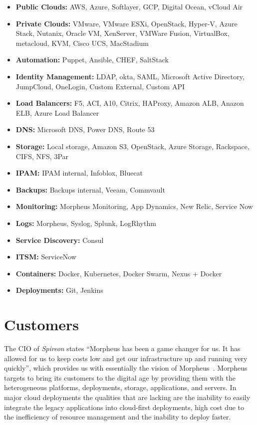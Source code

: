 \begin{itemize}
	\item \textbf{Public Clouds:} AWS, Azure, Softlayer, GCP, Digital 
	Ocean, vCloud Air
	\item \textbf{Private Clouds:} VMware, VMware ESXi, OpenStack, Hyper-V, 
	Azure Stack, Nutanix, Oracle VM, XenServer, VMWare Fusion, VirtualBox, 
	metacloud, KVM, Cisco UCS, MacStadium
	\item \textbf{Automation:} Puppet, Ansible, CHEF, SaltStack
	\item \textbf{Identity Management:} LDAP, okta, SAML, Microsoft Active 
	Directory, JumpCloud, OneLogin, Custom External, Custom API
	\item \textbf{Load Balancers:} F5, ACI, A10, Citrix, HAProxy, Amazon ALB, 
	Anazon ELB, Azure Load Balancer
	\item \textbf{DNS:} Microsoft DNS, Power DNS, Route 53
	\item \textbf{Storage:} Local storage, Amazon S3, OpenStack, Azure Storage, 
	Rackspace, CIFS, NFS, 3Par
	\item \textbf{IPAM:} IPAM internal, Infoblox, Bluecat
	\item \textbf{Backups:} Backups internal, Veeam, Commvault
	\item \textbf{Monitoring:} Morpheus Monitoring, App Dynamics, New Relic, 
	Service Now
	\item \textbf{Logs:} Morpheus, Syslog, Splunk, LogRhythm
	\item \textbf{Service Discovery:} Consul
	\item \textbf{ITSM:} ServiceNow
	\item \textbf{Containers:} Docker, Kubernetes, Docker Swarm, Nexus + Docker
	\item \textbf{Deployments:} Git, Jenkins  
\end{itemize}

\section{Customers}
\label{sec:customers}

The CIO of \textit{Spireon} states ``Morpheus has been a game changer for us. 
It has allowed for us to keep costs low and get our infrastructure up and 
running very quickly'', which provides us with essentially the vision of 
Morpheus~\cite{hid-sp18-416-www-morpheus-silicon-review}. Morpheus targets to 
bring its customers to the digital age by providing them with the heterogeneous 
platforms, deployments, storage, applications, and servers. In major cloud 
deployments the qualities that are lacking are the inability to easily 
integrate the legacy applications into cloud-first deployments, high cost due 
to the inefficiency of resource management and the inability to deploy faster.

